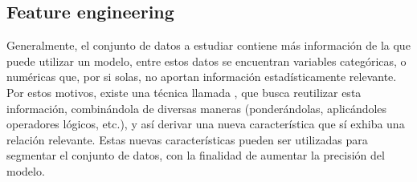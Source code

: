 \subsection{Feature engineering}

Generalmente, el conjunto de datos a estudiar contiene más información de la que puede utilizar un modelo, entre estos datos se encuentran variables categóricas, o numéricas que, por si solas, no aportan información estadísticamente relevante. Por estos motivos, existe una técnica llamada \fe, que busca reutilizar esta información, combinándola de diversas maneras (ponderándolas, aplicándoles operadores lógicos, etc.), y así derivar una nueva característica que sí exhiba una relación relevante. Estas nuevas características pueden ser utilizadas para segmentar el conjunto de datos, con la finalidad de aumentar la precisión del modelo.

